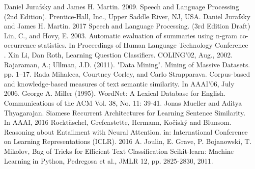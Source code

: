 \documentclass[letterpaper, 10 pt, conference]{ieeeconf}  %
\begin{document}
\begin{thebibliography}{99}

 Daniel Jurafsky and James H. Martin. 2009. Speech and Language Processing (2nd Edition). Prentice-Hall, Inc., Upper Saddle River, NJ, USA.
 Daniel Jurafsky and James H. Martin. 2017 Speech and Language Processing. (3rd Edition Draft) 
 Lin, C., and Hovy, E. 2003. Automatic evaluation of summaries
using n-gram co-occurrence statistics. In Proceedings of Human
Language Technology Conference .
 Xin Li, Dan Roth, Learning Question Classifiers. COLING'02, Aug., 2002.
 Rajaraman, A.; Ullman, J.D. (2011). "Data Mining". Mining of Massive Datasets. pp. 1–17.
 Rada Mihalcea, Courtney Corley, and Carlo Strapparava. Corpus-based and knowledge-based measures of text semantic similarity. In AAAI’06, July 2006.
 George A. Miller (1995). WordNet: A Lexical Database for English. 
Communications of the ACM Vol. 38, No. 11: 39-41.
 Jonas Mueller and Aditya Thyagarajan. Siamese Recurrent Architectures for Learning Sentence Similarity. In AAAI, 2016
 Rocktäschel, Grefenstette, Hermann, Kočiský and Blunsom. Reasoning about Entailment with Neural Attention. in: International Conference on Learning Representations (ICLR). 2016
 A. Joulin, E. Grave, P. Bojanowski, T. Mikolov, Bag of Tricks for Efficient Text Classification
 Scikit-learn: Machine Learning in Python, Pedregosa et al., JMLR 12, pp. 2825-2830, 2011.


\end{thebibliography}
\end{document}
